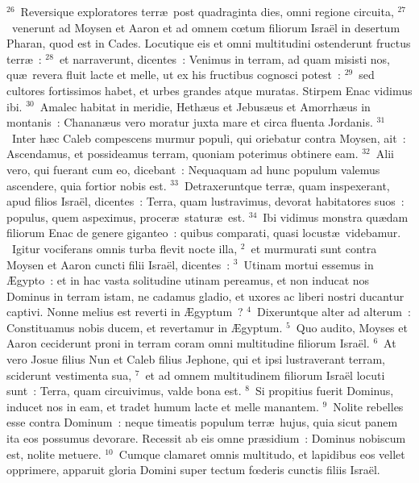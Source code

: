 ${}^{26}$~Reversique exploratores terr\ae\ post quadraginta dies, omni regione circuita,
${}^{27}$~venerunt ad Moysen et Aaron et ad omnem cœtum filiorum Isra\"el in desertum Pharan, quod est in Cades. Locutique eis et omni multitudini ostenderunt fructus terr\ae~:
${}^{28}$~et narraverunt, dicentes~: Venimus in terram, ad quam misisti nos, qu\ae\ revera fluit lacte et melle, ut ex his fructibus cognosci potest~:
${}^{29}$~sed cultores fortissimos habet, et urbes grandes atque muratas. Stirpem Enac vidimus ibi.
${}^{30}$~Amalec habitat in meridie, Heth\ae us et Jebus\ae us et Amorrh\ae us in montanis~: Chanan\ae us vero moratur juxta mare et circa fluenta Jordanis.
${}^{31}$~Inter h\ae c Caleb compescens murmur populi, qui oriebatur contra Moysen, ait~: Ascendamus, et possideamus terram, quoniam poterimus obtinere eam.
${}^{32}$~Alii vero, qui fuerant cum eo, dicebant~: Nequaquam ad hunc populum valemus ascendere, quia fortior nobis est.
${}^{33}$~Detraxeruntque terr\ae , quam inspexerant, apud filios Isra\"el, dicentes~: Terra, quam lustravimus, devorat habitatores suos~: populus, quem aspeximus, procer\ae\ statur\ae\ est.
${}^{34}$~Ibi vidimus monstra qu\ae dam filiorum Enac de genere giganteo~: quibus comparati, quasi locust\ae\ videbamur.
~\lettrine[lines=10,image=true,loversize=0.05,lraise=-0.03]{I}{}gitur vociferans omnis turba flevit nocte illa,
${}^{2}$~et murmurati sunt contra Moysen et Aaron cuncti filii Isra\"el, dicentes~:
${}^{3}$~Utinam mortui essemus in \AE gypto~: et in hac vasta solitudine utinam pereamus, et non inducat nos Dominus in terram istam, ne cadamus gladio, et uxores ac liberi nostri ducantur captivi. Nonne melius est reverti in \AE gyptum~?
${}^{4}$~Dixeruntque alter ad alterum~: Constituamus nobis ducem, et revertamur in \AE gyptum.
${}^{5}$~Quo audito, Moyses et Aaron ceciderunt proni in terram coram omni multitudine filiorum Isra\"el.
${}^{6}$~At vero Josue filius Nun et Caleb filius Jephone, qui et ipsi lustraverant terram, sciderunt vestimenta sua,
${}^{7}$~et ad omnem multitudinem filiorum Isra\"el locuti sunt~: Terra, quam circuivimus, valde bona est.
${}^{8}$~Si propitius fuerit Dominus, inducet nos in eam, et tradet humum lacte et melle manantem.
${}^{9}$~Nolite rebelles esse contra Dominum~: neque timeatis populum terr\ae\ hujus, quia sicut panem ita eos possumus devorare. Recessit ab eis omne pr\ae sidium~: Dominus nobiscum est, nolite metuere.
${}^{10}$~Cumque clamaret omnis multitudo, et lapidibus eos vellet opprimere, apparuit gloria Domini super tectum fœderis cunctis filiis Isra\"el.


